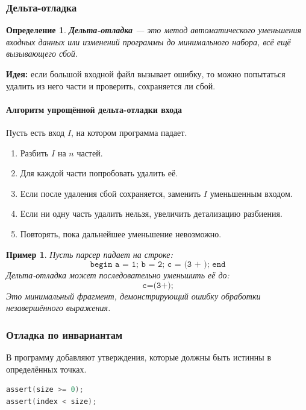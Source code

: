 \documentclass[12pt,a4paper]{article}
\newtheorem{definition}{Определение}
\newtheorem{example}{Пример}
\begin{document}
\subsubsection{Дельта-отладка}

\begin{definition}
\textbf{Дельта-отладка} --- это метод автоматического уменьшения входных данных или изменений программы до минимального набора, всё ещё вызывающего сбой.
\end{definition}

\textbf{Идея:} если большой входной файл вызывает ошибку, то можно попытаться удалить из него части и проверить, сохраняется ли сбой.

\paragraph{Алгоритм упрощённой дельта-отладки входа}

Пусть есть вход $I$, на котором программа падает.

\begin{enumerate}
    \item Разбить $I$ на $n$ частей.
    \item Для каждой части попробовать удалить её.
    \item Если после удаления сбой сохраняется, заменить $I$ уменьшенным входом.
    \item Если ни одну часть удалить нельзя, увеличить детализацию разбиения.
    \item Повторять, пока дальнейшее уменьшение невозможно.
\end{enumerate}

\begin{example}
Пусть парсер падает на строке:
\[
\texttt{begin a = 1; b = 2; c = (3 + ); end}
\]
Дельта-отладка может последовательно уменьшить её до:
\[
\texttt{c=(3+);}
\]
Это минимальный фрагмент, демонстрирующий ошибку обработки незавершённого выражения.
\end{example}

\subsubsection{Отладка по инвариантам}

В программу добавляют утверждения, которые должны быть истинны в определённых точках.

\begin{lstlisting}[language=C]
assert(size >= 0);
assert(index < size);
\end{lstlisting}
\end{document}
